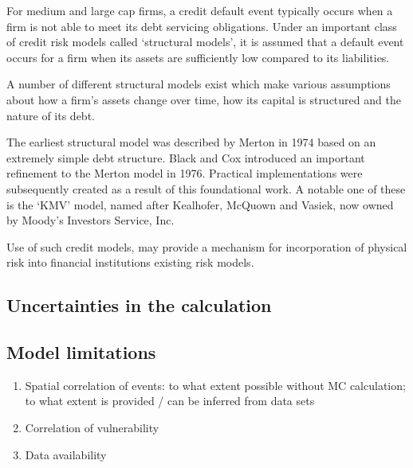 \documentclass[a4paper,11pt]{extarticle} %
\begin{document}
{For medium and large cap firms, a credit default event typically occurs when a firm is not able to meet its debt servicing obligations. Under an important class of credit risk models called `structural models', it is assumed that a default event occurs for a firm when its assets are sufficiently low compared to its liabilities. 

A number of different structural models exist which make various assumptions about how a firm's assets change over time, how its capital is structured and the nature of its debt. 

The earliest structural model was described by Merton in 1974 \cite{Merton:1974} based on an extremely simple debt structure. Black and Cox \cite{BlackCox:1976} introduced an important refinement to the Merton model in 1976. Practical implementations were subsequently created as a result of this foundational work. A notable one of these is the `KMV' model, named after Kealhofer, McQuown and Vasiek, now owned by Moody's Investors Service, Inc.  

Use of such credit models, may provide a mechanism for incorporation of physical risk into financial institutions existing risk models\cite{KenyonEtAl:2021}. 

\subsection{Uncertainties in the calculation}

\subsection{Model limitations}

\begin{enumerate}
	\item Spatial correlation of events: to what extent possible without MC calculation; to what extent is provided / can be inferred from data sets
	\item Correlation of vulnerability
	\item Data availability
\end{enumerate}


}
\end{document}
